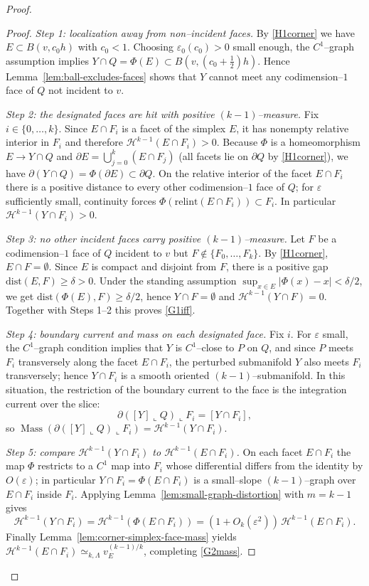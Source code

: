 \documentclass[11pt]{article}
\numberwithin{equation}{section}  %
\theoremstyle{plain}
\theoremstyle{definition}
\theoremstyle{remark}
\DeclareMathOperator{\Mass}{Mass}
\newcommand{\dist}{\mathrm{dist}}
\begin{document}
\begin{proof}
\begin{proof}

\emph{Step 1: localization away from non--incident faces.}
By \eqref{H1corner} we have $E\subset B(v,c_0h)$ with $c_0<1$.  Choosing $\varepsilon_0(c_0)>0$ small enough, the $C^1$--graph assumption implies
$Y\cap Q=\Phi(E)\subset B(v,(c_0+\tfrac12)h)$.  Hence Lemma~\ref{lem:ball-excludes-faces} shows that $Y$ cannot meet any codimension--$1$ face of $Q$ not incident to $v$.

\emph{Step 2: the designated faces are hit with positive $(k-1)$--measure.}
Fix $i\in\{0,\dots,k\}$.  Since $E\cap F_i$ is a facet of the simplex $E$, it has nonempty relative interior in $F_i$ and therefore $\mathcal H^{k-1}(E\cap F_i)>0$.
Because $\Phi$ is a homeomorphism $E\to Y\cap Q$ and $\partial E=\bigcup_{j=0}^k (E\cap F_j)$ (all facets lie on $\partial Q$ by \eqref{H1corner}),
we have $\partial(Y\cap Q)=\Phi(\partial E)\subset\partial Q$.
On the relative interior of the facet $E\cap F_i$ there is a positive distance to every other codimension--$1$ face of $Q$; for $\varepsilon$ sufficiently small,
continuity forces $\Phi(\mathrm{relint}(E\cap F_i))\subset F_i$.  In particular $\mathcal H^{k-1}(Y\cap F_i)>0$.

\emph{Step 3: no other incident faces carry positive $(k-1)$--measure.}
Let $F$ be a codimension--$1$ face of $Q$ incident to $v$ but $F\notin\{F_0,\dots,F_k\}$.  By \eqref{H1corner}, $E\cap F=\emptyset$.
Since $E$ is compact and disjoint from $F$, there is a positive gap $\dist(E,F)\ge \delta>0$.  Under the standing assumption $\sup_{x\in E}|\Phi(x)-x|<\delta/2$,
we get $\dist(\Phi(E),F)\ge \delta/2$, hence $Y\cap F=\emptyset$ and $\mathcal H^{k-1}(Y\cap F)=0$.
Together with Steps 1--2 this proves \eqref{G1iff}.

\emph{Step 4: boundary current and mass on each designated face.}
Fix $i$.  For $\varepsilon$ small, the $C^1$--graph condition implies that $Y$ is $C^1$--close to $P$ on $Q$, and since $P$ meets $F_i$ transversely along the facet $E\cap F_i$,
the perturbed submanifold $Y$ also meets $F_i$ transversely; hence $Y\cap F_i$ is a smooth oriented $(k-1)$--submanifold.
In this situation, the restriction of the boundary current to the face is the integration current over the slice:
\[
\partial([Y]\llcorner Q)\llcorner F_i = [Y\cap F_i],
\]
so $\Mass(\partial([Y]\llcorner Q)\llcorner F_i)=\mathcal H^{k-1}(Y\cap F_i)$.

\emph{Step 5: compare $\mathcal H^{k-1}(Y\cap F_i)$ to $\mathcal H^{k-1}(E\cap F_i)$.}
On each facet $E\cap F_i$ the map $\Phi$ restricts to a $C^1$ map into $F_i$ whose differential differs from the identity by $O(\varepsilon)$; in particular
$Y\cap F_i=\Phi(E\cap F_i)$ is a small--slope $(k-1)$--graph over $E\cap F_i$ inside $F_i$.
Applying Lemma~\ref{lem:small-graph-distortion} with $m=k-1$ gives
\[
\mathcal H^{k-1}(Y\cap F_i)=\mathcal H^{k-1}(\Phi(E\cap F_i))
=(1+O_k(\varepsilon^2))\,\mathcal H^{k-1}(E\cap F_i).
\]
Finally Lemma~\ref{lem:corner-simplex-face-mass} yields $\mathcal H^{k-1}(E\cap F_i)\simeq_{k,\Lambda} v_E^{(k-1)/k}$, completing \eqref{G2mass}.


\end{proof}
\end{proof}
\end{document}
